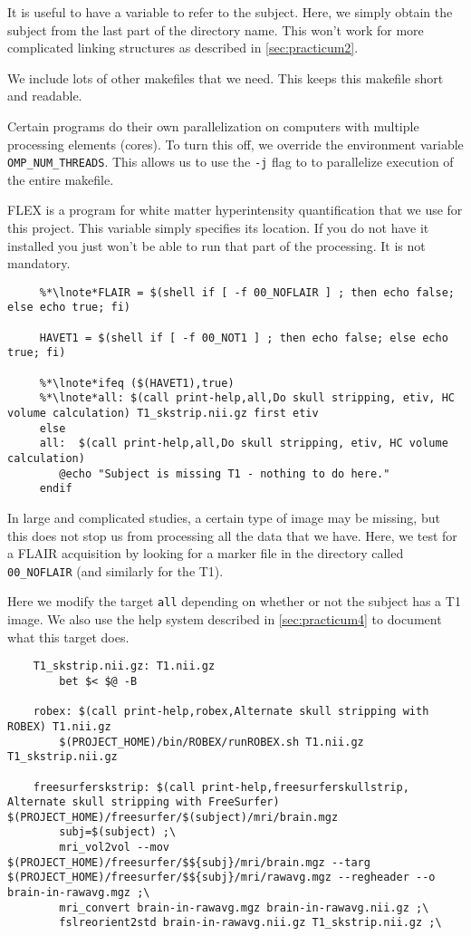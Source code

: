  It is useful to have a variable to refer to the
subject. Here, we simply obtain the subject from the last part of the
directory name. This won't work for more complicated linking
structures as described in \autoref{sec:practicum2}. 

 We include lots of other makefiles that we need. This keeps
this makefile short and readable. 

 Certain programs do their own parallelization on computers
with multiple processing elements (cores). To turn this off, we
override the environment variable \texttt{OMP_NUM_THREADS}. This
allows us to use the \texttt{-j} flag to \maken{} to parallelize
execution of the entire makefile.

 FLEX is a program for white matter hyperintensity
quantification that we use for this project. This variable simply
specifies its location. If you do not have it installed you just won't
be able to run that part of the processing. It is not mandatory. 

\begin{lstlisting}
	 %*\lnote*FLAIR = $(shell if [ -f 00_NOFLAIR ] ; then echo false; else echo true; fi)

	 HAVET1 = $(shell if [ -f 00_NOT1 ] ; then echo false; else echo true; fi)

	 %*\lnote*ifeq ($(HAVET1),true)
	 %*\lnote*all: $(call print-help,all,Do skull stripping, etiv, HC volume calculation) T1_skstrip.nii.gz first etiv
	 else
	 all:  $(call print-help,all,Do skull stripping, etiv, HC volume calculation)
		@echo "Subject is missing T1 - nothing to do here."
	 endif
\end{lstlisting}

 In large and complicated studies, a certain type of image may
be missing, but this does not stop us from processing all the data
that we have. Here, we test for a FLAIR acquisition by looking for a
marker file in the directory called \texttt{00_NOFLAIR} (and similarly
for the T1). 

 Here we modify the target \texttt{all} depending on whether
or not the subject has a T1 image. We also use the help system
described in \autoref{sec:practicum4} to document what this target
does. 


\begin{lstlisting}
	T1_skstrip.nii.gz: T1.nii.gz 
		bet $< $@ -B

	robex: $(call print-help,robex,Alternate skull stripping with ROBEX) T1.nii.gz 
		$(PROJECT_HOME)/bin/ROBEX/runROBEX.sh T1.nii.gz T1_skstrip.nii.gz

	freesurferskstrip: $(call print-help,freesurferskullstrip, Alternate skull stripping with FreeSurfer) $(PROJECT_HOME)/freesurfer/$(subject)/mri/brain.mgz
		subj=$(subject) ;\
		mri_vol2vol --mov $(PROJECT_HOME)/freesurfer/$${subj}/mri/brain.mgz --targ $(PROJECT_HOME)/freesurfer/$${subj}/mri/rawavg.mgz --regheader --o brain-in-rawavg.mgz ;\
		mri_convert brain-in-rawavg.mgz brain-in-rawavg.nii.gz ;\
		fslreorient2std brain-in-rawavg.nii.gz T1_skstrip.nii.gz ;\
\end{lstlisting}

